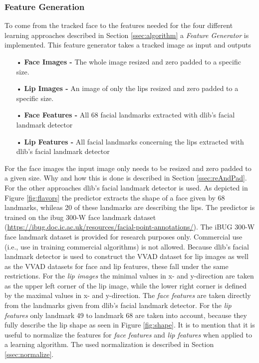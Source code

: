 \subsubsection{Feature Generation}
To come from the tracked face to the features needed for the four different learning approaches described in Section \ref{ssec:algorithm} a \emph{Feature Generator} is implemented.
This feature generator takes a tracked image as input and outputs 
\begin{itemize}
\item[•] \textbf{Face Images -}  The whole image resized and zero padded to a specific size.
\item[•] \textbf{Lip Images -} An image of only the lips resized and zero padded to a specific size.
\item[•] \textbf{Face Features -} All 68 facial landmarks extracted with dlib's facial landmark detector
\item[•] \textbf{Lip Features -} All facial landmarks concerning the lips extracted with dlib's facial landmark detector 
\end{itemize}
For the face images the input image only needs to be resized and zero padded to a given size. Why and how this is done is described in Section \ref{ssec:reAndPad}.
For the other approaches dlib's facial landmark detector 
is used. 
As depicted in Figure \ref{fig:flavors} the predictor extracts the shape of a face given by 68 landmarks, whileas 20 of these landmarks are describing the lips.
The predictor is trained on the ibug 300-W face landmark dataset (\url{https://ibug.doc.ic.ac.uk/resources/facial-point-annotations/}). 
The iBUG 300-W face landmark dataset is provided for research purposes only. Commercial use (i.e., use in training commercial algorithms) is not allowed.
Because dlib's facial landmark detector is used to construct the VVAD dataset for lip images as well as the VVAD datasets for face and lip features, these fall under the same restrictions.
For the \emph{lip images} the minimal values in x- and y-direction are taken as the upper left corner of the lip image, while the lower right corner is defined by the maximal values in x- and y-direction.
The \emph{face features} are taken directly from the landmarks given from dlib's facial landmark detector. 
For the \emph{lip features} only landmark 49 to landmark 68 are taken into account, because they fully describe the lip shape as seen in Figure \ref{fig:shape}.
It is to mention that it is useful to normalize the features for \emph{face features} and \emph{lip features} when applied to a learning algorithm. 
The used normalization is described in Section \ref{ssec:normalize}.

